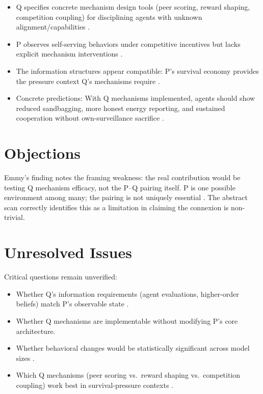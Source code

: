 \documentclass{article}
\begin{document}
\begin{itemize}
  \item Q specifies concrete mechanism design tools (peer scoring, reward shaping, competition coupling) for disciplining agents with unknown alignment/capabilities .
  \item P observes self-serving behaviors under competitive incentives but lacks explicit mechanism interventions .
  \item The information structures appear compatible: P's survival economy provides the pressure context Q's mechanisms require .
  \item Concrete predictions: With Q mechanisms implemented, agents should show reduced sandbagging, more honest energy reporting, and sustained cooperation without own-surveillance sacrifice .
\end{itemize}

\section*{Objections}

Emmy's finding notes the framing weakness: the real contribution would be testing Q mechanism efficacy, not the P--Q pairing itself. P is one possible environment among many; the pairing is not uniquely essential . The abstract scan correctly identifies this as a limitation in claiming the connexion is non-trivial.

\section*{Unresolved Issues}

Critical questions remain unverified:

\begin{itemize}
  \item Whether Q's information requirements (agent evaluations, higher-order beliefs) match P's observable state .
  \item Whether Q mechanisms are implementable without modifying P's core architecture.
  \item Whether behavioral changes would be statistically significant across model sizes .
  \item Which Q mechanisms (peer scoring vs.\ reward shaping vs.\ competition coupling) work best in survival-pressure contexts .
\end{itemize}
\end{document}
